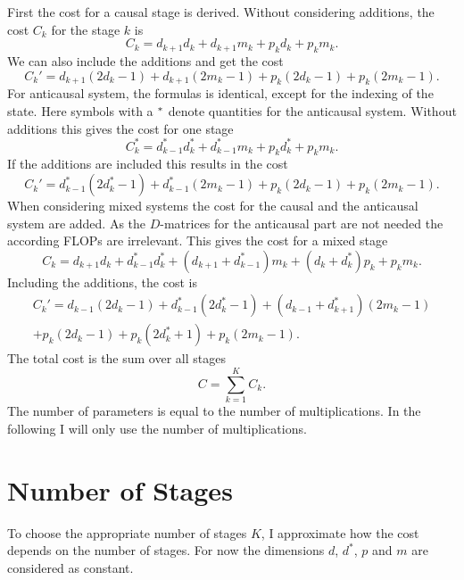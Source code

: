 \documentclass[doctype=mastersthesis,BCOR=15mm,biblatex]{ldvbook}%
\newcommand{\da}{d^*} %
\begin{document}
First the cost for a causal stage is derived.
Without considering additions, the cost $C_k$ for the stage $k$ is 
\begin{equation}
	C_k = d_{k+1}d_k + d_{k+1}m_k+p_kd_k+p_km_k
	.
\end{equation}
We can also include the additions and get the cost
 \begin{equation}
 	C_k' = d_{k+1}(2d_k-1) + d_{k+1}(2m_k-1)+p_k(2d_k-1)+p_k(2m_k-1)
 	.
 \end{equation}
For anticausal system, the formulas is identical, except for the indexing of the state.
Here symbols with a $\vphantom{d}^*$ denote quantities for the anticausal system.
Without additions this gives the cost for one stage
\begin{equation}
C^{*}_k = \da_{k-1}\da_k + \da_{k-1}m_k+p_k \da_k+p_km_k
.
\end{equation}
If the additions are included this results in the cost
\begin{equation}
C_k' = \da_{k-1}(2\da_k-1) + \da_{k-1}(2m_k-1)+p_k(2d_k-1)+p_k(2m_k-1).
\end{equation}
When considering mixed systems the cost for the causal and the anticausal system are added.
As the $D$-matrices for the anticausal part are not needed the according FLOPs are irrelevant.
This gives the cost for a mixed stage
\begin{equation}\label{eq:cost_mixed}
C_k = d_{k+1}d_k + \da_{k-1}\da_k + (d_{k+1}+\da_{k-1})m_k +(d_k+\da_k)p_k +p_km_k 
.
\end{equation}
Including the additions, the cost is
\begin{multline}
C_k' = d_{k-1}(2d_k-1)+ \da_{k-1}(2\da_k-1) 
+ (d_{k-1}+\da_{k+1})(2m_k-1)\\
+p_k(2d_k-1)+p_k(2\da_k+1)+p_k(2m_k-1)
.
\end{multline}
The total cost is the sum over all stages
\begin{equation}\label{eq:cost_total}
C = \sum_{k=1}^K C_k
.
\end{equation}
The number of parameters is equal to the number of multiplications.
In the following I will only use the number of multiplications.

\section{Number of Stages}\label{sec:Choose_K}
To choose the appropriate number of stages $K$, I approximate how the cost depends on the number of stages.
For now the dimensions $d$, $\da$, $p$ and $m$ are considered as constant.
\end{document}
